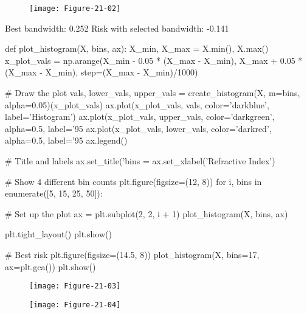 \begin{figure}[H]
\centering
\texttt{[image: Figure-21-02]}
\end{figure}
    
\begin{console}
Best bandwidth:                 0.252
Risk with selected bandwidth:   -0.141
\end{console}

\begin{python}
def plot_histogram(X, bins, ax):
    X_min, X_max = X.min(), X.max()
    x_plot_vals = np.arange(X_min - 0.05 * (X_max - X_min), X_max + 0.05 * (X_max - X_min), step=(X_max - X_min)/1000)
    
    # Draw the plot
    vals, lower_vals, upper_vals = create_histogram(X, m=bins, alpha=0.05)(x_plot_vals)
    ax.plot(x_plot_vals, vals, color='darkblue', label='Histogram')
    ax.plot(x_plot_vals, upper_vals, color='darkgreen', alpha=0.5, label='95%
    ax.plot(x_plot_vals, lower_vals, color='darkred', alpha=0.5, label='95%
    ax.legend()
    
    # Title and labels
    ax.set_title('bins = %
    ax.set_xlabel('Refractive Index')

    
# Show 4 different bin counts
plt.figure(figsize=(12, 8))
for i, bins in enumerate([5, 15, 25, 50]):
    
    # Set up the plot
    ax = plt.subplot(2, 2, i + 1)
    plot_histogram(X, bins, ax)

plt.tight_layout()
plt.show()

# Best risk
plt.figure(figsize=(14.5, 8))
plot_histogram(X, bins=17, ax=plt.gca())
plt.show()
\end{python}

\begin{figure}[H]
\centering
\texttt{[image: Figure-21-03]}
\end{figure}

\begin{figure}[H]
\centering
\texttt{[image: Figure-21-04]}
\end{figure}

